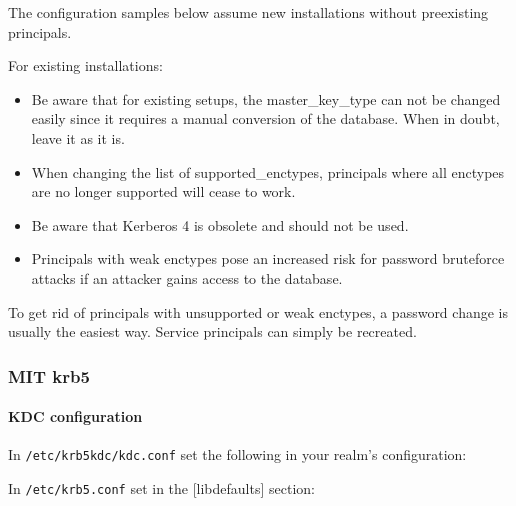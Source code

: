 The configuration samples below assume new installations without preexisting principals.

For existing installations:
\begin{itemize}
	\item Be aware that for existing setups, the master\_key\_type can not be changed easily since it requires a manual conversion of the database. When in doubt, leave it as it is. 
	\item When changing the list of supported\_enctypes, principals where all enctypes are no longer supported will cease to work.
	\item Be aware that Kerberos 4 is obsolete and should not be used.
	\item Principals with weak enctypes pose an increased risk for password bruteforce attacks if an attacker gains access to the database.
\end{itemize}

To get rid of principals with unsupported or weak enctypes, a password change is usually the easiest way. Service principals can simply be recreated. 

\subsubsection{MIT krb5}
\gdef\currentsubsectionname{krb5}
\paragraph{KDC configuration}
In \verb#/etc/krb5kdc/kdc.conf# set the following in your realm's
configuration:

In \verb#/etc/krb5.conf# set in the [libdefaults] section:




